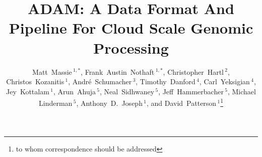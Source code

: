 \documentclass{bioinfo}
\begin{document}

\title[ADAM: Cloud Scale Genomic Processing]{ADAM: A Data Format And Pipeline For Cloud Scale Genomic Processing}
\author[Massie \textit{et~al}]{Matt~Massie\,$^{1,*}$, Frank~Austin~Nothaft\,$^{1,*}$, Christopher~Hartl\,$^{2}$, Christos~Kozanitis\,$^1$,
Andr\'{e}~Schumacher\,$^3$, Timothy~Danford\,$^4$, Carl~Yeksigian\,$^4$, Jey~Kottalam\,$^1$, Arun~Ahuja\,$^5$, Neal~Sidhwaney\,$^5$,
Jeff~Hammerbacher\,$^5$, Michael Linderman\,$^5$, Anthony~D.~Joseph\,$^1$, and David~Patterson$\,^1$\footnote{to whom correspondence
should be addressed}}
\address{$^{1}$Department of Electrical Engineering and Computer Science, University of California, Berkeley, CA\\
$^{2}$The Broad Institute of MIT and Harvard, Cambridge, MA\\
$^{3}$International Computer Science Institute (ICSI), University of California, Berkeley, CA\\
$^{4}$GenomeBridge, Cambridge, MA\\
$^{5}$Carl Icahn School of Medicine at Mount Sinai, New York, NY}



\maketitle
\end{document}
